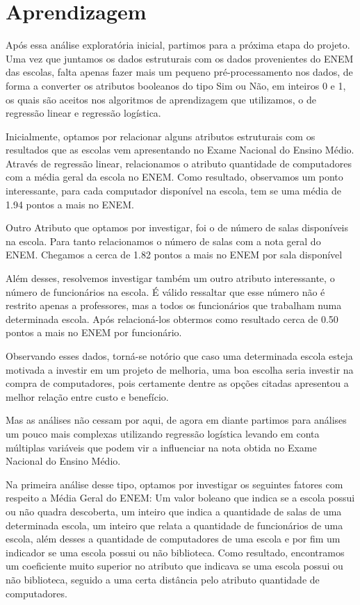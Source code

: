 \documentclass[review]{elsarticle}
\begin{document}
\section{Aprendizagem}
Após essa análise exploratória inicial, partimos para a próxima etapa do projeto. Uma vez que juntamos os dados estruturais com os dados provenientes do ENEM das escolas, falta apenas fazer mais um pequeno pré-processamento nos dados, de forma a converter os atributos booleanos do tipo Sim ou Não, em inteiros 0 e 1, os quais são aceitos nos algoritmos de aprendizagem que utilizamos, o de regressão linear e regressão logística.

Inicialmente, optamos por relacionar alguns atributos estruturais com os resultados que as escolas vem apresentando no Exame Nacional do Ensino Médio. Através de regressão linear, relacionamos o atributo quantidade de computadores com a média geral da escola no ENEM. Como resultado, observamos um ponto interessante, para cada computador disponível na escola, tem se uma média de 1.94 pontos a mais no ENEM.

Outro Atributo que optamos por investigar, foi o de número de salas disponíveis na escola. Para tanto relacionamos o número de salas com a nota geral do ENEM. Chegamos a cerca de 1.82 pontos a mais no ENEM por sala disponível

Além desses, resolvemos investigar também um outro atributo interessante, o número de funcionários na escola. É válido ressaltar que esse número não é restrito apenas a professores, mas a todos os funcionários que trabalham numa determinada escola. Após relacioná-los obtermos como resultado cerca de 0.50 pontos a mais no ENEM por funcionário.

Observando esses dados, torná-se notório que caso uma determinada escola esteja motivada a investir em um projeto de melhoria, uma boa escolha seria investir na compra de computadores, pois certamente dentre as opções citadas apresentou a melhor relação entre custo e benefício.

Mas as análises não cessam por aqui, de agora em diante partimos para análises um pouco mais complexas utilizando regressão logística levando em conta múltiplas variáveis que podem vir a influenciar na nota obtida no Exame Nacional do Ensino Médio. 

Na primeira análise desse tipo, optamos por investigar os seguintes fatores com respeito a Média Geral do ENEM: Um valor boleano que indica se a escola possui ou não quadra descoberta, um inteiro que indica a quantidade de salas de uma determinada escola, um inteiro que relata a quantidade de funcionários de uma escola,  além desses a quantidade de computadores de uma escola e por fim um indicador se uma escola possui ou não biblioteca. Como resultado, encontramos um coeficiente muito superior no atributo que indicava se uma escola possui ou não biblioteca, seguido a uma certa distância pelo atributo quantidade de computadores.
\end{document}
